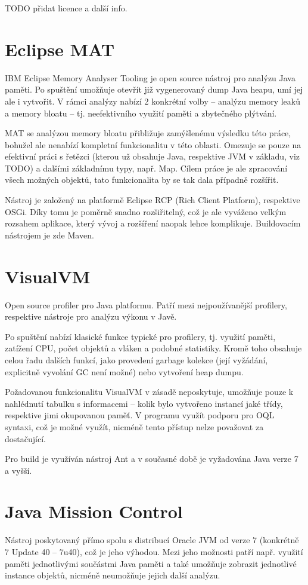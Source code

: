 TODO přidat licence a další info.

\section{Eclipse MAT}
IBM Eclipse Memory Analyser Tooling je open source nástroj pro analýzu Java paměti. Po spuštění umožňuje otevřít již vygenerovaný dump Java heapu, umí jej ale i vytvořit. V rámci analýzy nabízí 2 konkrétní volby – analýzu memory leaků a memory bloatu – tj. neefektivního využití paměti a zbytečného plýtvání. 

MAT se analýzou memory bloatu přibližuje zamýšlenému výsledku této práce, bohužel ale nenabízí kompletní funkcionalitu v této oblasti. Omezuje se pouze na efektivní práci s řetězci (kterou už obsahuje Java, respektive JVM v základu, viz TODO) a dalšími základnímu typy, např. Map. Cílem práce je ale zpracování všech možných objektů, tato funkcionalita by se tak dala případně rozšířit.

Nástroj je založený na platformě Eclipse RCP (Rich Client Platform), respektive OSGi. Díky tomu je poměrně snadno rozšiřitelný, což je ale vyváženo velkým rozsahem aplikace, který vývoj a rozšíření naopak lehce komplikuje. Buildovacím nástrojem je zde Maven.

\section{VisualVM}
Open source profiler pro Java platformu. Patří mezi nejpoužívanější profilery, respektive nástroje pro analýzu výkonu v Javě.

Po spuštění nabízí klasické funkce typické pro profilery, tj. využití paměti, zatížení CPU, počet objektů a vláken a podobné statistiky. Kromě toho obsahuje celou řadu dalších funkcí, jako provedení garbage kolekce (její vyžádání, explicitně vyvolání GC není možné) nebo vytvoření heap dumpu.

Požadovanou funkcionalitu VisualVM v zásadě neposkytuje, umožňuje pouze k nahlédnutí tabulku s informacemi – kolik bylo vytvořeno instancí jaké třídy, respektive jimi okupovanou paměť. V programu využít podporu pro OQL syntaxi, což je možné využít, nicméně tento přístup nelze považovat za dostačující.

Pro build je využíván nástroj Ant a v současné době je vyžadována Java verze 7 a vyšší.

\section{Java Mission Control}
Nástroj poskytovaný přímo spolu s distribucí Oracle JVM od verze 7 (konkrétně 7 Update 40 – 7u40), což je jeho výhodou. Mezi jeho možnosti patří např. využití paměti jednotlivými součástmi Java paměti a také umožňuje zobrazit jednotlivé instance objektů, nicméně neumožňuje jejich další analýzu.

